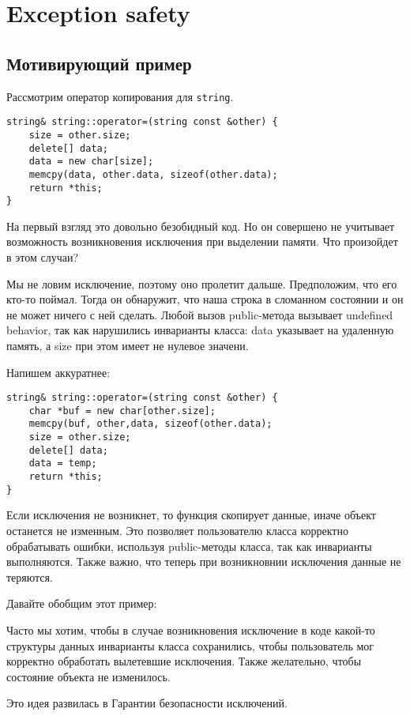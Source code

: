 \section{Exception safety}
\subsection{Мотивирующий пример}
Рассмотрим оператор копирования для \texttt{string}.
\begin{verbatim}
string& string::operator=(string const &other) {
    size = other.size;
    delete[] data;
    data = new char[size];
    memcpy(data, other.data, sizeof(other.data);
    return *this;
}
\end{verbatim}    

На первый взгляд это довольно безобидный код. Но он совершено не учитывает возможность возникновения исключения при выделении памяти. Что произойдет в этом случаи?

Мы не ловим исключение, поэтому оно пролетит дальше. Предположим, что его кто-то поймал. Тогда он обнаружит, что наша строка в сломанном состоянии и он не может ничего с ней сделать. Любой вызов public-метода вызывает undefined behavior, так как нарушились инварианты класса: data указывает на удаленную память, а  size при этом имеет не нулевое значени.

Напишем аккуратнее:
\begin{verbatim}
string& string::operator=(string const &other) {
    char *buf = new char[other.size];
    memcpy(buf, other,data, sizeof(other.data);
    size = other.size;
    delete[] data;
    data = temp;
    return *this;
}
\end{verbatim}

Если исключения не возникнет, то функция скопирует данные, иначе объект останется не изменным. Это позволяет пользователю класса корректно обрабатывать ошибки, используя public-методы класса, так как инварианты выполняются. Также важно, что теперь при возникновнии исключения данные не теряются.

Давайте обобщим этот пример:

Часто мы хотим, чтобы в случае возникновения исключение в коде какой-то структуры данных инварианты класса сохранились, чтобы пользователь мог корректно обработать вылетевшие исключения. Также желательно, чтобы состояние объекта не изменилось.

Это идея развилась в Гарантии безопасности исключений.

